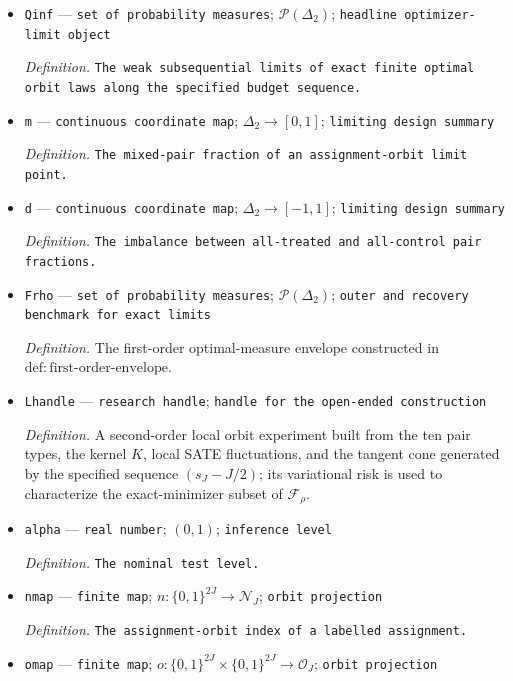\documentclass{article}
\begin{document}
\begin{itemize}
  \item \texttt{Qinf} --- \texttt{set of probability measures}; \(\mathcal P(\Delta_2)\); \texttt{headline optimizer-\allowbreak{}limit object}
  \par\smallskip\noindent\emph{Definition.} \texttt{The weak subsequential limits of exact finite optimal orbit laws along the specified budget sequence.}
  \item \texttt{m} --- \texttt{continuous coordinate map}; \(\Delta_2\to[0,1]\); \texttt{limiting design summary}
  \par\smallskip\noindent\emph{Definition.} \texttt{The mixed-\allowbreak{}pair fraction of an assignment-\allowbreak{}orbit limit point.}
  \item \texttt{d} --- \texttt{continuous coordinate map}; \(\Delta_2\to[-1,1]\); \texttt{limiting design summary}
  \par\smallskip\noindent\emph{Definition.} \texttt{The imbalance between all-\allowbreak{}treated and all-\allowbreak{}control pair fractions.}
  \item \texttt{Frho} --- \texttt{set of probability measures}; \(\mathcal P(\Delta_2)\); \texttt{outer and recovery benchmark for exact limits}
  \par\smallskip\noindent\emph{Definition.} The first-order optimal-measure envelope constructed in \(\mathrm{def:first\text{-}order\text{-}envelope}\).
  \item \texttt{Lhandle} --- \texttt{research handle}; \texttt{handle for the open-\allowbreak{}ended construction}
  \par\smallskip\noindent\emph{Definition.} A second-order local orbit experiment built from the ten pair types, the kernel \(K\), local SATE fluctuations, and the tangent cone generated by the specified sequence \((s_J-J/2)\); its variational risk is used to characterize the exact-minimizer subset of \(\mathcal F_\rho\).
  \item \texttt{alpha} --- \texttt{real number}; \((0,1)\); \texttt{inference level}
  \par\smallskip\noindent\emph{Definition.} \texttt{The nominal test level.}
  \item \texttt{nmap} --- \texttt{finite map}; \(n:\{0,1\}^{2J}\to\mathcal N_J\); \texttt{orbit projection}
  \par\smallskip\noindent\emph{Definition.} \texttt{The assignment-\allowbreak{}orbit index of a labelled assignment.}
  \item \texttt{omap} --- \texttt{finite map}; \(o:\{0,1\}^{2J}\times\{0,1\}^{2J}\to\mathcal O_J\); \texttt{orbit projection}

\end{itemize}
\end{document}
